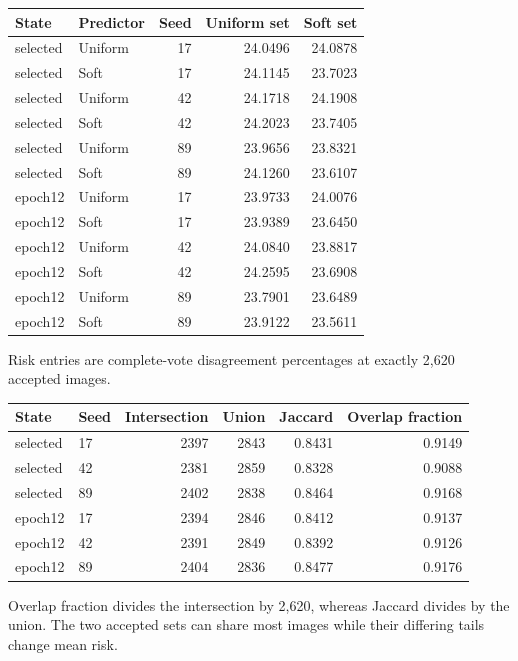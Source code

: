 \documentclass[10pt]{article}
\begin{document}
\begin{longtable}{llrrr}\toprule State & Predictor & Seed & Uniform set & Soft set\\\midrule\endhead
selected & Uniform & 17 & 24.0496 & 24.0878\\
selected & Soft & 17 & 24.1145 & 23.7023\\
selected & Uniform & 42 & 24.1718 & 24.1908\\
selected & Soft & 42 & 24.2023 & 23.7405\\
selected & Uniform & 89 & 23.9656 & 23.8321\\
selected & Soft & 89 & 24.1260 & 23.6107\\
epoch12 & Uniform & 17 & 23.9733 & 24.0076\\
epoch12 & Soft & 17 & 23.9389 & 23.6450\\
epoch12 & Uniform & 42 & 24.0840 & 23.8817\\
epoch12 & Soft & 42 & 24.2595 & 23.6908\\
epoch12 & Uniform & 89 & 23.7901 & 23.6489\\
epoch12 & Soft & 89 & 23.9122 & 23.5611\\
\bottomrule\end{longtable}
Risk entries are complete-vote disagreement percentages at exactly 2,620 accepted images.
\begin{longtable}{llrrrr}\toprule State & Seed & Intersection & Union & Jaccard & Overlap fraction\\\midrule\endhead
selected & 17 & 2397 & 2843 & 0.8431 & 0.9149\\
selected & 42 & 2381 & 2859 & 0.8328 & 0.9088\\
selected & 89 & 2402 & 2838 & 0.8464 & 0.9168\\
epoch12 & 17 & 2394 & 2846 & 0.8412 & 0.9137\\
epoch12 & 42 & 2391 & 2849 & 0.8392 & 0.9126\\
epoch12 & 89 & 2404 & 2836 & 0.8477 & 0.9176\\
\bottomrule\end{longtable}
Overlap fraction divides the intersection by 2,620, whereas Jaccard divides by the union. The two accepted sets can share most images while their differing tails change mean risk.
\end{document}
